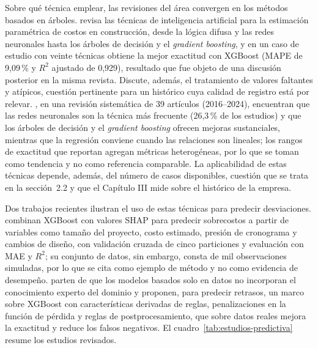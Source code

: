 Sobre qué técnica emplear, las revisiones del área convergen en los métodos basados en árboles. \textcite{Elmousalami2020} revisa las técnicas de inteligencia artificial para la estimación paramétrica de costos en construcción, desde la lógica difusa y las redes neuronales hasta los árboles de decisión y el \textit{gradient boosting}, y en un caso de estudio con veinte técnicas obtiene la mejor exactitud con XGBoost (MAPE de 9,09\,\% y $R^2$ ajustado de 0,929), resultado que fue objeto de una discusión posterior en la misma revista. Discute, además, el tratamiento de valores faltantes y atípicos, cuestión pertinente para un histórico cuya calidad de registro está por relevar\@. \textcite{AIcostEstimation2024}, en una revisión sistemática de 39 artículos (2016--2024), encuentran que las redes neuronales son la técnica más frecuente (26,3\,\% de los estudios) y que los árboles de decisión y el \textit{gradient boosting} ofrecen mejoras sustanciales, mientras que la regresión conviene cuando las relaciones son lineales; los rangos de exactitud que reportan agregan métricas heterogéneas, por lo que se toman como tendencia y no como referencia comparable. La aplicabilidad de estas técnicas depende, además, del número de casos disponibles, cuestión que se trata en la sección~2.2 y que el Capítulo III mide sobre el histórico de la empresa.

Dos trabajos recientes ilustran el uso de estas técnicas para predecir desviaciones. \textcite{XGBoostCostOverrun2026} combinan XGBoost con valores SHAP para predecir sobrecostos a partir de variables como tamaño del proyecto, costo estimado, presión de cronograma y cambios de diseño, con validación cruzada de cinco particiones y evaluación con MAE y $R^2$; su conjunto de datos, sin embargo, consta de mil observaciones simuladas, por lo que se cita como ejemplo de método y no como evidencia de desempeño. \textcite{Shen2025} parten de que los modelos basados solo en datos no incorporan el conocimiento experto del dominio y proponen, para predecir retrasos, un marco sobre XGBoost con características derivadas de reglas, penalizaciones en la función de pérdida y reglas de postprocesamiento, que sobre datos reales mejora la exactitud y reduce los falsos negativos. El cuadro~\ref{tab:estudios-predictiva} resume los estudios revisados.

